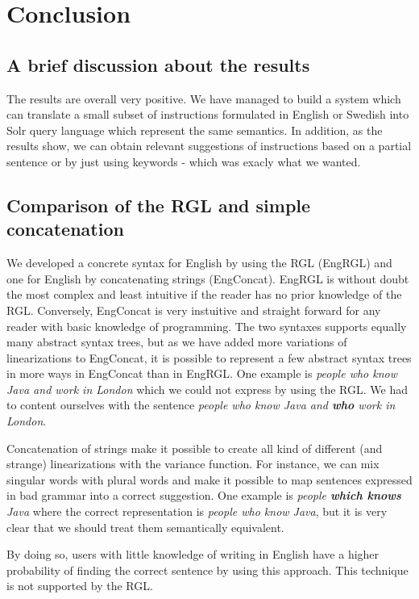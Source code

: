 \chapter{Conclusion}\label{ch:conclusion}
\section{A brief discussion about the results}
The results are overall very positive. We have managed to build a system which can translate a small subset of instructions formulated in English or Swedish into Solr query language which represent the same semantics. In addition, as the results show, we can obtain relevant suggestions of instructions based on a partial sentence or by just using keywords - which was exacly what we wanted.

\section{Comparison of the RGL and simple concatenation}\label{sec:comparison}
We developed a concrete syntax for English by using the RGL (EngRGL) and one for English by concatenating strings (EngConcat). EngRGL is without doubt the most complex and least intuitive if the reader has no prior knowledge of the RGL. Conversely, EngConcat is very instuitive and straight forward for any reader with basic knowledge of programming. The two syntaxes supports equally many abstract syntax trees, but as we have added more variations of linearizations to EngConcat, it is possible to represent a few abstract syntax trees in more ways in EngConcat than in EngRGL. One example is \emph{people who know Java and work in London} which we could not express by using the RGL. We had to content  ourselves with the sentence \emph{people who know Java and \textbf{who} work in London}.

Concatenation of strings make it possible to create all kind of different (and strange) linearizations with the variance function. For instance, we can mix singular words with plural words and make it possible to map sentences expressed in bad grammar into a correct suggestion. One example is \emph{people \textbf{which knows} Java} where the correct representation is \emph{people who know Java}, but it is very clear that we should treat them semantically equivalent.

By doing so, users with little knowledge of writing in English have a higher probability of finding the correct sentence by using this approach. This technique is not supported by the RGL.

